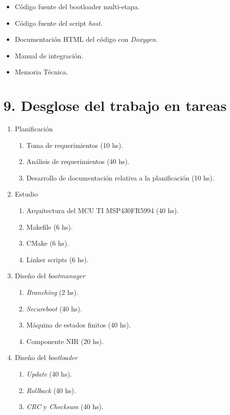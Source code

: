 \documentclass[
11pt, %
]{charter}
\begin{document}
\begin{itemize}
	\item Código fuente del bootloader multi-etapa.
	\item Código fuente del script \textit{host}.
	\item Documentación HTML del código con \textit{Doxygen}. 
	\item Manual de integración.
	\item Memoria Técnica.
\end{itemize}

\section{9. Desglose del trabajo en tareas}
\label{sec:wbs}

\begin{enumerate}
\item Planificación
	\begin{enumerate}
	\item Toma de requerimientos (10 hs).
	\item Análisis de requerimientos (40 hs).
	\item Desarrollo de documentación relativa a la planificación (10 hs).
	\end{enumerate}
\item Estudio
	\begin{enumerate}
	\item Arquitectura del MCU TI MSP430FR5994 (40 hs).
	\item Makefile (6 hs).
	\item CMake (6 hs).
	\item Linker scripts (6 hs).
	\end{enumerate}
\item Diseño del \textit{bootmanager}
	\begin{enumerate}
	\item \textit{Branching} (2 hs).
	\item \textit{Secureboot} (40 hs).
	\item Máquina de estados finitos (40 hs).
	\item Componente NIR (20 hs).
	\end{enumerate}
\item Diseño del \textit{bootloader}
	\begin{enumerate}
	\item \textit{Update} (40 hs).
	\item \textit{Rollback} (40 hs).
	\item \textit{CRC} y \textit{Checksum} (40 hs).

\end{enumerate}
\end{enumerate}
\end{document}
